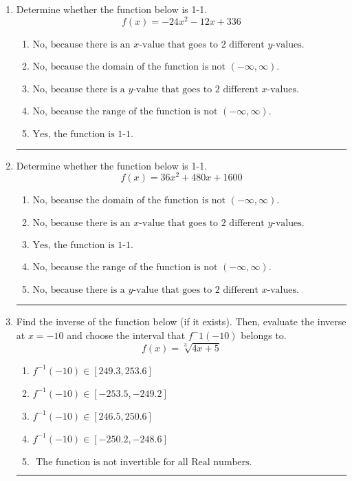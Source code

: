 \documentclass[14pt]{extbook}
\newcommand{\litem}[1]{\item#1\hspace*{-1cm}\rule{\textwidth}{0.4pt}}
\begin{document}
\begin{enumerate}
\litem{
Determine whether the function below is 1-1.\[ f(x) = -24 x^2 - 12 x + 336 \]\begin{enumerate}[label=\Alph*.]
\item \( \text{No, because there is an $x$-value that goes to 2 different $y$-values.} \)
\item \( \text{No, because the domain of the function is not $(-\infty, \infty)$.} \)
\item \( \text{No, because there is a $y$-value that goes to 2 different $x$-values.} \)
\item \( \text{No, because the range of the function is not $(-\infty, \infty)$.} \)
\item \( \text{Yes, the function is 1-1.} \)

\end{enumerate} }
\litem{
Determine whether the function below is 1-1.\[ f(x) = 36 x^2 + 480 x + 1600 \]\begin{enumerate}[label=\Alph*.]
\item \( \text{No, because the domain of the function is not $(-\infty, \infty)$.} \)
\item \( \text{No, because there is an $x$-value that goes to 2 different $y$-values.} \)
\item \( \text{Yes, the function is 1-1.} \)
\item \( \text{No, because the range of the function is not $(-\infty, \infty)$.} \)
\item \( \text{No, because there is a $y$-value that goes to 2 different $x$-values.} \)

\end{enumerate} }
\litem{
Find the inverse of the function below (if it exists). Then, evaluate the inverse at $x = -10$ and choose the interval that $f^-1(-10)$ belongs to.\[ f(x) = \sqrt[3]{4 x + 5} \]\begin{enumerate}[label=\Alph*.]
\item \( f^{-1}(-10) \in [249.3, 253.6] \)
\item \( f^{-1}(-10) \in [-253.5, -249.2] \)
\item \( f^{-1}(-10) \in [246.5, 250.6] \)
\item \( f^{-1}(-10) \in [-250.2, -248.6] \)
\item \( \text{ The function is not invertible for all Real numbers. } \)


\end{enumerate}}
\end{enumerate}
\end{document}
